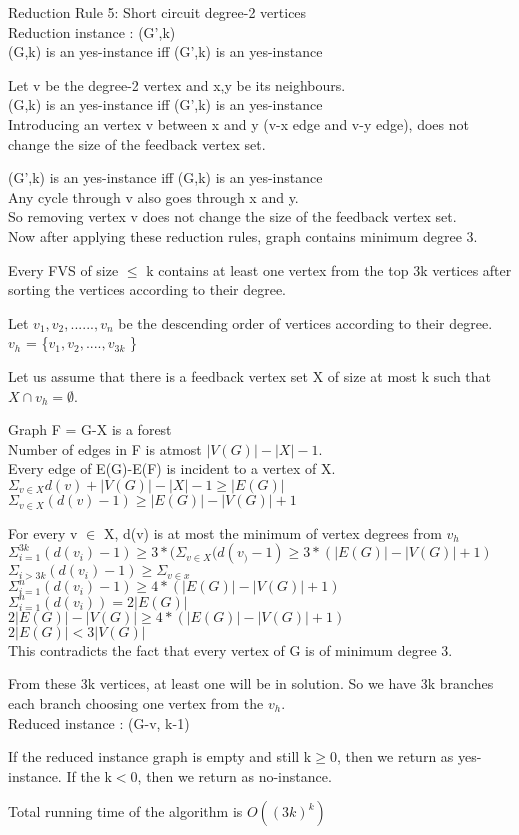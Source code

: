 Reduction Rule 5: Short circuit degree-2 vertices \\
Reduction instance : (G',k) \\
(G,k) is an yes-instance iff (G',k) is an yes-instance

Let v be the degree-2 vertex and x,y be its neighbours. \\
(G,k) is an yes-instance iff (G',k) is an yes-instance \\
Introducing an vertex v between x and y (v-x edge and v-y edge), does not change the size
of the feedback vertex set.

(G',k) is an yes-instance iff (G,k) is an yes-instance \\
Any cycle through v also goes through x and y. \\
So removing vertex v does not change the size of the feedback vertex set. \\

Now after applying these reduction rules, graph contains minimum degree 3. 

Every FVS of size $\leq$ k contains at least one vertex from the top 3k vertices after sorting
the vertices according to their degree. 

Let $v_1, v_2, ......, v_n$ be the descending order of vertices according to their degree. \\
$v_h$ = \{$v_1,v_2,....,v_{3k}$ \} 

Let us assume that there is a feedback vertex set X of size at most k such that $X \cap v_{h} = \emptyset$.

Graph F = G-X is a forest  \\
Number of edges in F is atmost $|V(G)|-|X|-1$. \\
Every edge of E(G)-E(F) is incident to a vertex of X. \\
$\Sigma_{v \in X} d(v) + |V(G)|-|X|-1 \geq |E(G)|$ \\
$\Sigma_{v \in X} (d(v)-1) \geq |E(G)|-|V(G)|+1$ 

For every v $\in$ X, d(v) is at most the minimum of vertex degrees from $v_h$ \\
$\Sigma_{i=1}^{3k}(d(v_i)-1) \geq 3*(\Sigma_{v \in X}(d(v_)-1) \geq 3*(|E(G)|-|V(G)|+1)$ \\
$\Sigma_{i>3k}(d(v_i)-1) \geq \Sigma_{v \in x}$     \\
$\Sigma_{i=1}^{n}(d(v_i)-1) \geq 4*(|E(G)|-|V(G)|+1)$ \\
$\Sigma_{i=1}^{n}(d(v_i)) = 2|E(G)|$ \\
$2|E(G)| - |V(G)| \geq 4*(|E(G)|-|V(G)|+1)$ \\
$2|E(G)| < 3|V(G)|$ \\
This contradicts the fact that every vertex of G is of minimum degree 3.

From these 3k vertices, at least one will be in solution. So we have 3k branches each branch
choosing one vertex from the $v_h$. \\
Reduced instance : (G-v, k-1)

If the reduced instance graph is empty and still k$\geq$0, then we return as yes-instance.
If the k$<$0, then we return as no-instance.

Total running time of the algorithm is $O((3k)^k)$


